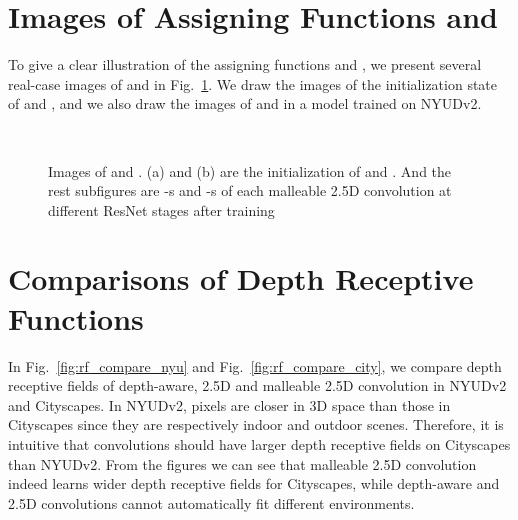 \documentclass[runningheads]{llncs}
\begin{document}
\section{Images of Assigning Functions  and }
To give a clear illustration of the assigning functions  and , we present several real-case images of  and  in Fig.~\ref{fig:h_g}.
We draw the images of the initialization state of  and , and we also draw the images of  and  in a model trained on NYUDv2.
\begin{figure}[htbp]
  \centering
  \\
  \caption{
    Images of  and .
    (a) and (b) are the initialization of  and .
    And the rest subfigures are -s and -s of each malleable 2.5D convolution at different ResNet stages after training
  }
  \label{fig:h_g}
\end{figure}

\section{Comparisons of Depth Receptive Functions}
In Fig.~\ref{fig:rf_compare_nyu} and Fig.~\ref{fig:rf_compare_city}, we compare depth receptive fields of depth-aware, 2.5D and malleable 2.5D convolution in NYUDv2 and Cityscapes.
In NYUDv2, pixels are closer in 3D space than those in Cityscapes since they are respectively indoor and outdoor scenes.
Therefore, it is intuitive that convolutions should have larger depth receptive fields on Cityscapes than NYUDv2.
From the figures we can see that malleable 2.5D convolution indeed learns wider depth receptive fields for Cityscapes, while depth-aware and 2.5D convolutions cannot automatically fit different environments.
\end{document}
